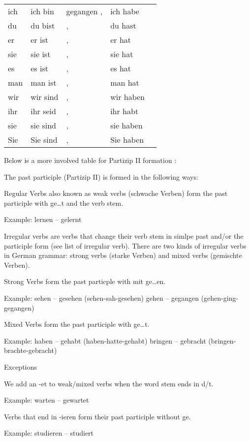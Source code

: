 \documentclass[a4paper,twocolumn,10pt]{article}
\newcommand{\newpar}
{\par \vspace{0.3cm}}
\newcommand{\tabularxtable}[3]
{

	\vspace{0.5cm}
	\nolinenumbers

	\begin{tabularx}{#1}{#2}
		#3
	\end{tabularx}

	\linenumbers
	\vspace{0.5cm}
}
\begin{document}
\tabularxtable
{0.95\linewidth}
{l|l|llX}
{

ich & ich bin  & gegangen  , & ich habe  & \\
du  & du bist  & ,           & du hast   & \\
er  & er ist   & ,           & er hat    & \\
sie & sie ist  & ,           & sie hat   & \\
es  & es ist   & ,           & es hat    & \\
man & man ist  & ,           & man hat   & \\
wir & wir sind & ,           & wir haben & \\
ihr & ihr seid & ,           & ihr habt  & \\
sie & sie sind & ,           & sie haben & \\
Sie & Sie sind & ,           & Sie haben & \\
}


Below is a more involved table for Partizip II formation :\newpar


The past participle (Partizip II) is formed in the following ways:

Regular Verbs also known as weak verbs (schwache Verben) form the past
participle with ge…t and the verb stem.

Example:
    lernen – gelernt

Irregular verbs are verbs that change their verb stem in simlpe past and/or the
participle form (see list of irregular verb). There are two kinds of irregular
verbs in German grammar: strong verbs (starke Verben) and mixed verbs (gemischte
Verben).

Strong Verbs form the past particple with mit ge…en.

Example:
sehen – gesehen (sehen-sah-gesehen)
gehen – gegangen (gehen-ging-gegangen)

Mixed Verbs form the past participle with ge…t.

Example:
haben – gehabt (haben-hatte-gehabt)
bringen – gebracht
(bringen-brachte-gebracht)

Exceptions

We add an -et to weak/mixed verbs when the word stem ends in d/t.

Example:
warten – gewartet

Verbs that end in -ieren form their past participle without
ge.

Example:
studieren – studiert
\end{document}
